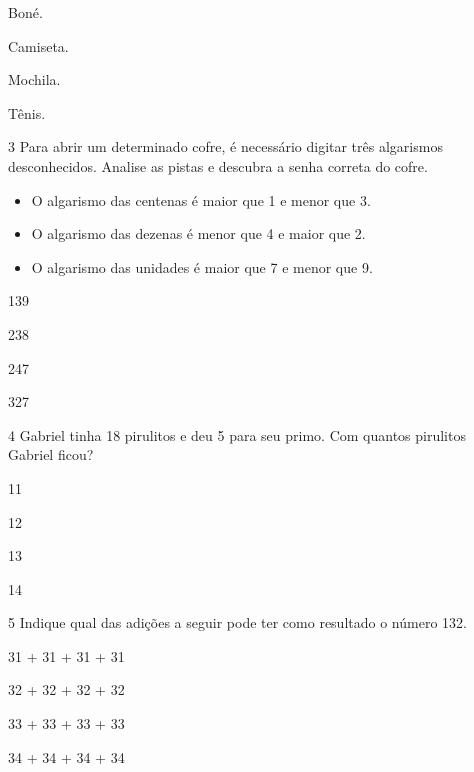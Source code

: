 \begin{escolha}[itemsep=-5pt]
\item Boné.

\item Camiseta.

\item Mochila.

\item Tênis.
\end{escolha}

\num{3} Para abrir um determinado cofre, é necessário digitar três algarismos
desconhecidos. Analise as pistas e descubra a senha correta do cofre.

\begin{itemize}
\item
  O algarismo das centenas é maior que 1 e menor que 3.
\item
  O algarismo das dezenas é menor que 4 e maior que 2.
\item
  O algarismo das unidades é maior que 7 e menor que 9.
\end{itemize}


\begin{escolha}[itemsep=-5pt]
\item 139

\item 238

\item 247

\item 327
\end{escolha}

\num{4} Gabriel tinha 18 pirulitos e deu 5 para seu primo. Com quantos
pirulitos Gabriel ficou?

\begin{escolha}[itemsep=-5pt]
\item 11

\item 12

\item 13

\item 14
\end{escolha}

\num{5} Indique qual das adições a seguir pode ter como resultado o número 132.

\begin{escolha}[itemsep=-5pt]
\item 31 + 31 + 31 + 31

\item 32 + 32 + 32 + 32

\item 33 + 33 + 33 + 33

\item 34 + 34 + 34 + 34
\end{escolha}


